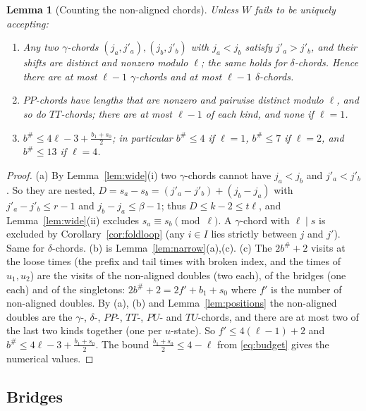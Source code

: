 \documentclass[11pt]{article}
\newtheorem{lemma}[theorem]{Lemma}
\theoremstyle{definition}
\begin{document}
\begin{lemma}[Counting the non-aligned chords]\label{lem:counts}
Unless $W$ fails to be uniquely accepting:
\begin{enumerate}[leftmargin=2.2em,itemsep=2pt,label=(\alph*)]
\item Any two $\gamma$-chords $(j_a,j'_a),(j_b,j'_b)$ with $j_a<j_b$ satisfy
$j'_a>j'_b$, and their shifts are distinct and nonzero modulo $\ell$; the
same holds for $\delta$-chords. Hence there are at most $\ell-1$
$\gamma$-chords and at most $\ell-1$ $\delta$-chords.
\item $PP$-chords have lengths that are nonzero and pairwise distinct modulo
$\ell$, and so do $TT$-chords; there are at most $\ell-1$ of each kind, and
none if $\ell=1$.
\item $b^{\#}\le 4\ell-3+\frac{b_1+s_0}{2}$; in particular $b^{\#}\le4$ if
$\ell=1$, $b^{\#}\le7$ if $\ell=2$, and $b^{\#}\le13$ if $\ell=4$.
\end{enumerate}
\end{lemma}

\begin{proof}
(a) By Lemma~\ref{lem:wide}(i) two $\gamma$-chords cannot have
$j_a<j_b$ and $j'_a<j'_b$. So they are nested, $D=s_a-s_b=(j'_a-j'_b)+(j_b-j_a)$
with $j'_a-j'_b\le r-1$ and $j_b-j_a\le\beta-1$; thus $D\le k-2\le t\ell$,
and Lemma~\ref{lem:wide}(ii) excludes $s_a\equiv s_b\pmod\ell$. A
$\gamma$-chord with $\ell\mid s$ is excluded by Corollary~\ref{cor:foldloop}
(any $i\in I$ lies strictly between $j$ and $j'$). Same for $\delta$-chords.
(b) is Lemma~\ref{lem:narrow}(a),(c). (c) The $2b^{\#}+2$ visits at the loose
times (the prefix and tail times with broken index, and the times of
$u_1,u_2$) are the visits of the non-aligned doubles (two each), of the
bridges (one each) and of the singletons: $2b^{\#}+2=2f'+b_1+s_0$ where $f'$
is the number of non-aligned doubles. By (a), (b) and
Lemma~\ref{lem:positions} the non-aligned doubles are the $\gamma$-,
$\delta$-, $PP$-, $TT$-, $PU$- and $TU$-chords, and there are at most two of
the last two kinds together (one per $u$-state). So $f'\le4(\ell-1)+2$ and
$b^{\#}\le 4\ell-3+\frac{b_1+s_0}2$. The bound $\frac{b_1+s_0}2\le 4-\ell$
from \eqref{eq:budget} gives the numerical values.
\end{proof}

\subsection{Bridges}\label{sec:bridges}
\end{document}
